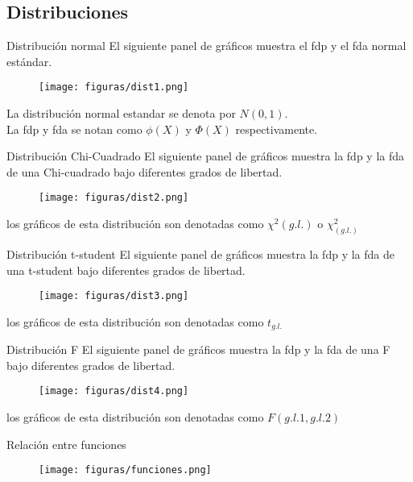 \subsection{Distribuciones}
\begin{frame}{Distribución normal}
	El siguiente panel de gráficos muestra el fdp y el fda normal estándar.
		\begin{figure}
			\centering
			\texttt{[image: figuras/dist1.png]}
		\end{figure}
	La distribución normal estandar se denota por $N(0,1)$.\\
	La fdp y fda se notan como $\phi(X)$ y $\Phi(X)$ respectivamente.
\end{frame}
\begin{frame}{Distribución Chi-Cuadrado}
	El siguiente panel de gráficos muestra la fdp y la fda de una Chi-cuadrado bajo diferentes grados de libertad.
		\begin{figure}
			\centering
			\texttt{[image: figuras/dist2.png]}
		\end{figure}
	los gráficos de esta distribución son denotadas como $\chi^{2}(g.l.)$ o $\chi_{(g.l.)}^{2}$
\end{frame}
\begin{frame}{Distribución t-student}
	El siguiente panel de gráficos muestra la fdp y la fda de una t-student bajo diferentes grados de libertad.
		\begin{figure}
			\centering
			\texttt{[image: figuras/dist3.png]}
		\end{figure}
	los gráficos de esta distribución son denotadas como $t_{g.l.}$
\end{frame}
\begin{frame}{Distribución F}
	El siguiente panel de gráficos muestra la fdp y la fda de una F bajo diferentes grados de libertad.
		\begin{figure}
			\centering
			\texttt{[image: figuras/dist4.png]}
		\end{figure}
	los gráficos de esta distribución son denotadas como $F(g.l. 1 , g.l. 2)$
\end{frame}
\begin{frame}{Relación entre funciones}
	\begin{figure}
		\centering
		\texttt{[image: figuras/funciones.png]}
	\end{figure}
\end{frame}
